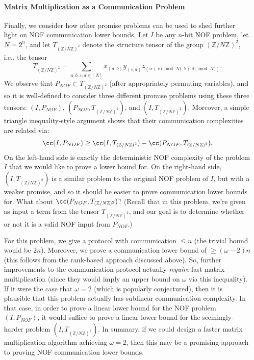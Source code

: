      \paragraph{Matrix Multiplication as a Communication Problem}

     Finally, we consider how other promise problems can be used to shed further light on NOF communication lower bounds. Let $I$ be any $n$-bit NOF problem, let $N = 2^n$, and let $T_{(\mathbb{Z} / N\mathbb{Z})^2}$ denote the structure tensor of the group $(\mathbb{Z} / N\mathbb{Z})^2$, i.e., the tensor
$$T_{(\mathbb{Z} / N\mathbb{Z})^2} = \sum_{a,b,c,d \in [N]} x_{(a,b)} y_{(c,d)} z_{(a+c\pmod{N}, b+d\pmod{N})}.$$
    We observe that $P_{NOF} \subset T_{(\mathbb{Z} / N\mathbb{Z})^2}$ (after appropriately permuting variables), and so it is well-defined to consider three different promise problems using these three tensors: $(I,P_{NOF})$, $(P_{NOF},T_{(\mathbb{Z} / N\mathbb{Z})^2})$, and $(I,T_{(\mathbb{Z} / N\mathbb{Z})^2})$. Moreover, a simple triangle inequality-style argument shows that their communication complexities are related via:
    $$\cc(I,P_{NOF}) \geq \cc(I,T_{(\mathbb{Z} / N\mathbb{Z})^2}) - \cc(P_{NOF},T_{(\mathbb{Z} / N\mathbb{Z})^2}).$$
    On the left-hand side is exactly the deterministic NOF complexity of the problem $I$ that we would like to prove a lower bound for. On the right-hand side, $(I,T_{(\mathbb{Z} / N\mathbb{Z})^2})$ is a similar problem to the original NOF problem of $I$, but with a weaker promise, and so it should be easier to prove communication lower bounds for. What about $\cc(P_{NOF},T_{(\mathbb{Z} / N\mathbb{Z})^2})$? (Recall that in this problem, we're given as input a term from the tensor $T_{(\mathbb{Z} / N\mathbb{Z})^2}$, and our goal is to determine whether or not it is a valid NOF input from $P_{NOF}$.)

    For this problem, we give a protocol with communication $\leq n$ (the trivial bound would be $2n$). Moreover, we prove a communication lower bound of $\geq (\omega - 2) n$ (this follows from the rank-based approach discussed above). So, further improvements to the communication protocol actually \emph{require} fast matrix multiplication (since they would imply an upper bound on $\omega$ via this inequality). If it were the case that $\omega = 2$ (which is popularly conjectured), then it is plausible that this problem actually has sublinear communication complexity. In that case, in order to prove a linear lower bound for the NOF problem $(I,P_{NOF})$, it would suffice to prove a linear lower bound for the seemingly-harder problem $(I,T_{(\mathbb{Z} / N\mathbb{Z})^2})$. In summary, if we could design a faster matrix multiplication algorithm achieving $\omega=2$, then this may be a promising approach to proving NOF communication lower bounds.
